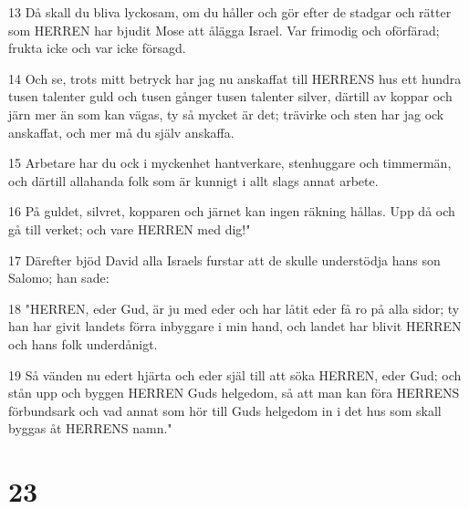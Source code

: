 \par 13 Då skall du bliva lyckosam, om du håller och gör efter de stadgar och rätter som HERREN har bjudit Mose att ålägga Israel. Var frimodig och oförfärad; frukta icke och var icke försagd.
\par 14 Och se, trots mitt betryck har jag nu anskaffat till HERRENS hus ett hundra tusen talenter guld och tusen gånger tusen talenter silver, därtill av koppar och järn mer än som kan vägas, ty så mycket är det; trävirke och sten har jag ock anskaffat, och mer må du själv anskaffa.
\par 15 Arbetare har du ock i myckenhet hantverkare, stenhuggare och timmermän, och därtill allahanda folk som är kunnigt i allt slags annat arbete.
\par 16 På guldet, silvret, kopparen och järnet kan ingen räkning hållas. Upp då och gå till verket; och vare HERREN med dig!"
\par 17 Därefter bjöd David alla Israels furstar att de skulle understödja hans son Salomo; han sade:
\par 18 "HERREN, eder Gud, är ju med eder och har låtit eder få ro på alla sidor; ty han har givit landets förra inbyggare i min hand, och landet har blivit HERREN och hans folk underdånigt.
\par 19 Så vänden nu edert hjärta och eder själ till att söka HERREN, eder Gud; och stån upp och byggen HERREN Guds helgedom, så att man kan föra HERRENS förbundsark och vad annat som hör till Guds helgedom in i det hus som skall byggas åt HERRENS namn."

\chapter{23}

